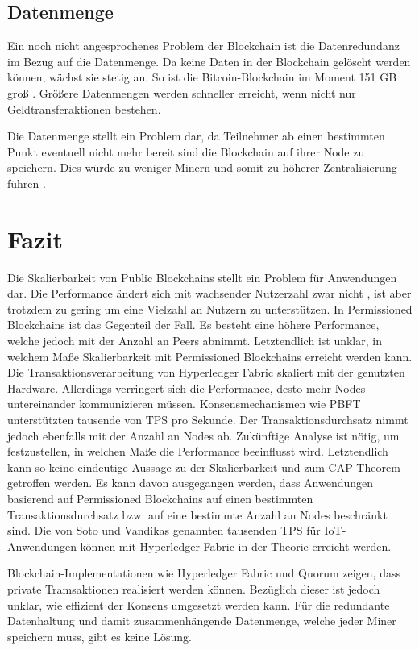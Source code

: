 \subsection{Datenmenge}
Ein noch nicht angesprochenes Problem der Blockchain ist die Datenredundanz im Bezug auf die Datenmenge. Da keine Daten in der Blockchain gelöscht werden können, wächst sie stetig an. So ist die Bitcoin-Blockchain im Moment 151 GB groß \cite{BlockchainUnternehmenBlockchainSizeBitcoin}. Größere Datenmengen werden schneller erreicht, wenn nicht nur Geldtransferaktionen bestehen.

Die Datenmenge stellt ein Problem dar, da Teilnehmer ab einen bestimmten Punkt eventuell nicht mehr bereit sind die Blockchain auf ihrer Node zu speichern. Dies würde zu weniger Minern und somit zu höherer Zentralisierung führen \cite{SchererPerformanceScalabilityBlockchain2017}.

\section{Fazit}
Die Skalierbarkeit von Public Blockchains stellt ein Problem für Anwendungen dar. Die Performance ändert sich mit wachsender Nutzerzahl zwar nicht \cite{SchererPerformanceScalabilityBlockchain2017}, ist aber trotzdem zu gering um eine Vielzahl an Nutzern zu unterstützen. In Permissioned Blockchains ist das Gegenteil der Fall. Es besteht eine höhere Performance, welche jedoch mit der Anzahl an Peers abnimmt. Letztendlich ist unklar, in welchem Maße Skalierbarkeit mit Permissioned Blockchains erreicht werden kann. Die Transaktionsverarbeitung von Hyperledger Fabric skaliert mit der genutzten Hardware. Allerdings verringert sich die Performance, desto mehr Nodes untereinander kommunizieren müssen. Konsensmechanismen wie \acs{PBFT} unterstützten tausende von \acs{TPS} pro Sekunde. Der Transaktionsdurchsatz nimmt jedoch ebenfalls mit der Anzahl an Nodes ab. Zukünftige Analyse ist nötig, um festzustellen, in welchen Maße die Performance beeinflusst wird. Letztendlich kann so keine eindeutige Aussage zu der Skalierbarkeit und zum CAP-Theorem getroffen werden. Es kann davon ausgegangen werden, dass Anwendungen basierend auf Permissioned Blockchains auf einen bestimmten Transaktionsdurchsatz bzw. auf eine bestimmte Anzahl an Nodes beschränkt sind. Die von Soto und Vandikas genannten tausenden \acs{TPS} für IoT-Anwendungen können mit Hyperledger Fabric in der Theorie erreicht werden. 

Blockchain-Implementationen wie Hyperledger Fabric und Quorum zeigen, dass private Tramsaktionen realisiert werden können. Bezüglich dieser ist jedoch unklar, wie effizient der Konsens umgesetzt werden kann. Für die redundante Datenhaltung und damit zusammenhängende Datenmenge, welche jeder Miner speichern muss, gibt es keine Lösung.





